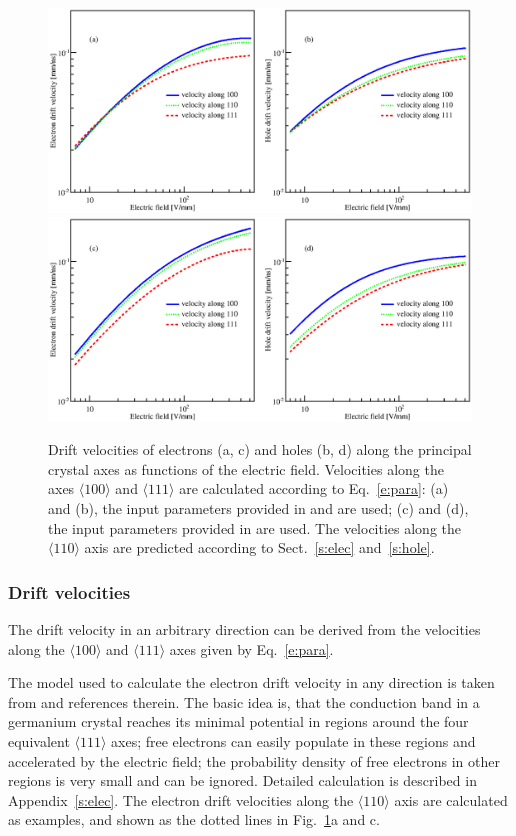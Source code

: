 \documentclass[epj]{svjour}
\begin{document}
\begin{figure}[tb]
\centering
\includegraphics[width=0.8\linewidth]{VvsElucian} 
\includegraphics[width=0.8\linewidth]{VvsEbart} 
\caption{Drift velocities of electrons (a, c) and holes (b, d) along
the principal crystal axes as functions of the electric
field. Velocities along the axes $\langle 100 \rangle$ and $\langle
111 \rangle$ are calculated according to Eq.~\ref{e:para}: (a) and
(b), the input parameters provided in \cite{miha} and \cite{reg} are
used; (c) and (d), the input parameters provided in \cite{bart} are
used. The velocities along the $\langle 110 \rangle$ axis are
predicted according to Sect.~\ref{s:elec} and~\ref{s:hole}.}
\label{f:vvse} 
\end{figure} 

\subsubsection{Drift velocities}
\label{s:vel}
The drift velocity in an arbitrary direction can be derived from the
velocities along the $\langle 100 \rangle$ and $\langle 111 \rangle$
axes given by Eq.~\ref{e:para}.

The model used to calculate the electron drift velocity in any
direction is taken from \cite{miha} and references therein. The basic
idea is, that the conduction band in a germanium crystal reaches its
minimal potential in regions around the four equivalent $\langle 111
\rangle$ axes; free electrons can easily populate in these regions and
accelerated by the electric field; the probability density of free
electrons in other regions is very small and can be ignored. Detailed
calculation is described in Appendix~\ref{s:elec}. The electron drift
velocities along the $\langle 110 \rangle$ axis are calculated as
examples, and shown as the dotted lines in Fig.~\ref{f:vvse}a and c.
\end{document}
